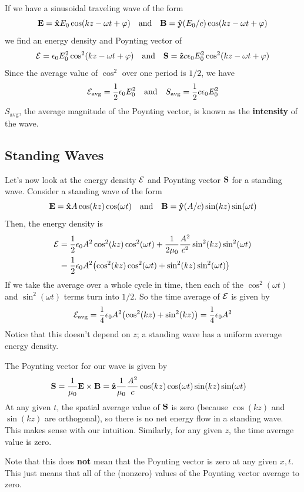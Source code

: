 If we have a sinusoidal traveling wave of the form
\[ \mathbf{E} = \mathbf{\hat{x}} E_0 \cos(kz-\omega t +\varphi) \quad\text{and}\quad \mathbf{B} = \mathbf{\hat{y}} (E_0/c)\cos(kz-\omega t+\varphi) \]
we find an energy density and Poynting vector of
\[ \mathcal{E} = \epsilon_0 E_0^2\cos^2(kz-\omega t +\varphi) \quad\text{and}\quad \mathbf{S} = \mathbf{\hat{z}} c\epsilon_0E_0^2\cos^2(kz-\omega t+\varphi) \]
Since the average value of $\cos^2$ over one period is $1/2$, we have
\[ \mathcal{E}_\text{avg} = \frac{1}{2}\epsilon_0 E_0^2 \quad\text{and} \quad S_\text{avg} = \frac{1}{2}c\epsilon_0E_0^2\]
$S_\text{avg}$, the average magnitude of the Poynting vector, is known as the \textbf{intensity} of the wave. 
\subsection*{Standing Waves}
Let's now look at the energy density $\mathcal{E}$ and Poynting vector $\mathbf{S}$ for a standing wave. Consider a standing wave of the form
\[ \mathbf{E} = \mathbf{\hat{x}} A\cos(kz)\cos(\omega t) \quad\text{and}\quad \mathbf{B} = \mathbf{\hat{y}} (A/c)\sin(kz)\sin(\omega t)\]
Then, the energy density is
\begin{align*}
    \mcl E &= \frac{1}{2}\epsilon_0 A^2 \cos^2(kz)\cos^2(\omega t) + \frac{1}{2\mu_0}\frac{A^2}{c^2}\sin^2(kz)\sin^2(\omega t) \\
    &= \frac{1}{2}\epsilon_0 A^2\pqty{\cos^2(kz)\cos^2(\omega t) + \sin^2(kz)\sin^2(\omega t)}
\end{align*}
If we take the average over a whole cycle in time, then each of the $\cos^2(\omega t)$ and $\sin^2(\omega t)$ terms turn into $1/2$. So the time average of $\mathcal{E}$ is given by
\[ \mcl E_\text{avg} = \frac{1}{4}\epsilon_0 A^2\pqty{\cos^2(kz)+\sin^2(kz)} = \frac{1}{4}\epsilon_0 A^2 \]
Notice that this doesn't depend on $z$; a standing wave has a uniform average energy density. 

The Poynting vector for our wave is given by
\begin{align*}
    \mathbf{S} &= \frac{1}{\mu_0}\mathbf{E}\times\mathbf{B} = \mathbf{\hat{z}} \frac{1}{\mu_0}\frac{A^2}{c}\cos(kz)\cos(\omega t)\sin(kz)\sin(\omega t) 
\end{align*}
At any given $t$, the spatial average value of $\mathbf{S}$ is zero (because $\cos(kz)$ and $\sin(kz)$ are orthogonal), so there is no net energy flow in a standing wave. This makes sense with our intuition. Similarly, for any given $z$, the time average value is zero.

Note that this does \textbf{not} mean that the Poynting vector is zero at any given $x,t$. This just means that all of the (nonzero) values of the Poynting vector average to zero.

